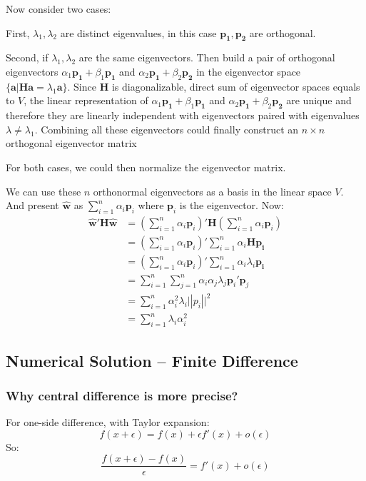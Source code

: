 \documentclass{article}
\newcommand{\V}[1]{\boldsymbol{#1}}
\begin{document}
Now consider two cases:

First,  
\(\lambda_1, \lambda_2\) are distinct eigenvalues, in this case
\(\V{p_1}, \V{p_2}\) are orthogonal.

\vspace{2mm}
Second, if \(\lambda_1, \lambda_2\) are the same eigenvectors. Then
build a pair of orthogonal eigenvectors \(\alpha_1\V{p_1} + \beta_1\V{p_1}\)
and \(\alpha_2\V{p_1}+\beta_2\V{p_2}\) in the eigenvector space
\(\{\V{a}|\V{H}\V{a}=\lambda_1\V{a}\}\). Since \(\V{H}\) is diagonalizable,
direct sum of eigenvector spaces equals to \(V\), the linear representation of \(\alpha_1\V{p_1} + \beta_1\V{p_1}\)
and \(\alpha_2\V{p_1}+\beta_2\V{p_2}\) are unique and therefore they are 
linearly independent
with eigenvectors paired with eigenvalues \(\lambda\neq \lambda_1\). Combining
all these eigenvectors could finally construct an \(n\times n\) orthogonal eigenvector matrix 

\vspace{2mm}
For both cases, we could then normalize the eigenvector matrix.

We can use these \(n\) orthonormal eigenvectors as a basis in the
linear space \(V\). And present \(\hat{\V{w}}\) as
\(\sum_{i=1}^n\alpha_i\V{p}_i\) where \(\V{p}_i\) is the eigenvector.
Now:
\begin{equation}
\begin{split}
\hat{\V{w}}'\V{H}\hat{\V{w}}
&=(\sum_{i=1}^n\alpha_i\V{p}_i)'\V{H}(\sum_{i=1}^n\alpha_i\V{p}_i)\\
&=(\sum_{i=1}^n\alpha_i\V{p}_i)'\sum_{i=1}^n
\alpha_i\V{H}\V{p_i}\\
&=(\sum_{i=1}^n\alpha_i\V{p}_i)'\sum_{i=1}^n\alpha_i\lambda_i\V{p_i}\\
&=\sum_{i=1}^n\sum_{j=1}^n\alpha_i\alpha_j\lambda_j\V{p}_i'\V{p}_j\\
&=\sum_{i=1}^n\alpha_i^2\lambda_i\V||{p}_i||^2\\
&=\sum_{i=1}^n\lambda_i\alpha_i^2
\end{split}
\end{equation}

\subsection{Numerical Solution -- Finite Difference}
\subsubsection{Why central difference is more precise?}
For one-side difference, with Taylor expansion:
\begin{equation}
f(x+\epsilon)=f(x)+\epsilon f'(x)+o(\epsilon)
\end{equation}
So:
\begin{equation}
\frac{f(x+\epsilon)-f(x)}{\epsilon}=f'(x)+o(\epsilon)
\end{equation}
\end{document}
